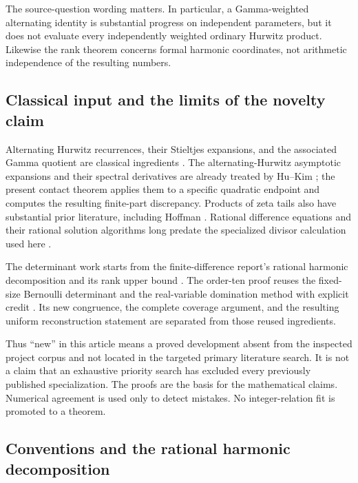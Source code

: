 \documentclass[11pt]{article}
\theoremstyle{definition}
\theoremstyle{remark}
\numberwithin{equation}{section}
\begin{document}
The source-question wording matters. In particular, a Gamma-weighted
alternating identity is substantial progress on independent parameters,
but it does not evaluate every independently weighted ordinary Hurwitz
product. Likewise the rank theorem concerns formal harmonic coordinates,
not arithmetic independence of the resulting numbers.

\subsection{Classical input and the limits of the novelty claim}

Alternating Hurwitz recurrences, their Stieltjes expansions, and the
associated Gamma quotient are classical ingredients
\cite{bil:HuKim,bil:WangHuKim}. The alternating-Hurwitz asymptotic
expansions and their spectral derivatives are already treated by
Hu--Kim \cite{HuKimAsymptotic}; the present contact theorem applies them
to a specific quadratic endpoint and computes the resulting finite-part
discrepancy. Products of zeta tails also have substantial prior
literature, including Hoffman \cite{bil:Hoffman}. Rational difference
equations and their rational solution algorithms long predate the
specialized divisor calculation used here \cite{rat:Abramov}.

The determinant work starts from the finite-difference report's rational
harmonic decomposition and its rank upper bound \cite{FiniteDifferenceIncoming}.
The order-ten proof reuses the fixed-size Bernoulli determinant and
the real-variable domination method with explicit credit
\cite{GeneralHankel,AlternatingIncoming,QuarticIncoming}. Its new
congruence, the complete coverage argument, and the resulting uniform
reconstruction statement are separated from those reused ingredients.

Thus ``new'' in this article means a proved development absent from
the inspected project corpus and not located in the targeted primary
literature search. It is not a claim that an exhaustive priority search
has excluded every previously published specialization. The proofs are
the basis for the mathematical claims. Numerical agreement is used only
to detect mistakes. No integer-relation fit is promoted to a theorem.

\subsection{Conventions and the rational harmonic decomposition}
\end{document}
